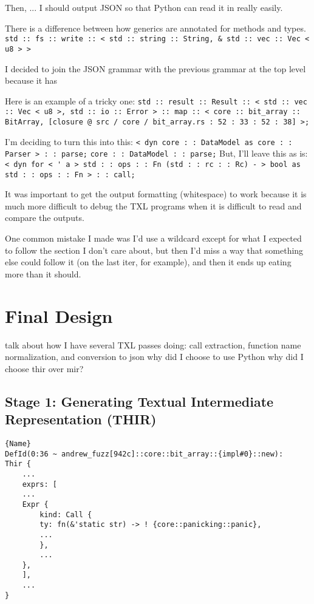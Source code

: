\documentclass[11pt]{article}
\begin{document}
Then, ... I should output JSON so that Python can read it in really easily.

There is a difference between how generics are annotated for methods and types.
\lstinline{std :: fs :: write :: < std :: string :: String, & std :: vec :: Vec < u8 > >}

I decided to join the JSON grammar with the previous grammar at the top level because it has 

Here is an example of a tricky one:
\lstinline{std :: result :: Result :: < std :: vec :: Vec < u8 >, std :: io :: Error > :: map :: < core :: bit_array :: BitArray, [closure @ src / core / bit_array.rs : 52 : 33 : 52 : 38] >;}

I'm deciding to turn this into this:
\lstinline{< dyn core : : DataModel as core : : Parser > : : parse;}
\lstinline{core : : DataModel : : parse;}
But, I'll leave this as is:
\lstinline{< dyn for < ' a > std : : ops : : Fn (std : : rc : : Rc) - > bool as std : : ops : : Fn > : : call;}

It was important to get the output formatting (whitespace) to work because it is much more difficult to debug the TXL programs when it is difficult to read and compare the outputs.


One common mistake I made was I'd use a wildcard except for what I expected to follow the section I don't care about, but then I'd miss a way that something else could follow it (on the last iter, for example), and then it ends up eating more than it should.

\section{Final Design} %
talk about how I have several TXL passes doing: call extraction, function name normalization, and conversion to json
why did I choose to use Python
why did I choose thir over mir?

\subsection{Stage 1: Generating Textual Intermediate Representation (THIR)}

\begin{lstlisting}[caption=THIR-flat]{Name}
DefId(0:36 ~ andrew_fuzz[942c]::core::bit_array::{impl#0}::new):
Thir {
    ...
    exprs: [
    ...
    Expr {
        kind: Call {
        ty: fn(&'static str) -> ! {core::panicking::panic},
        ...
        },
        ...
    },
    ],
    ...
}
\end{lstlisting}
\end{document}
